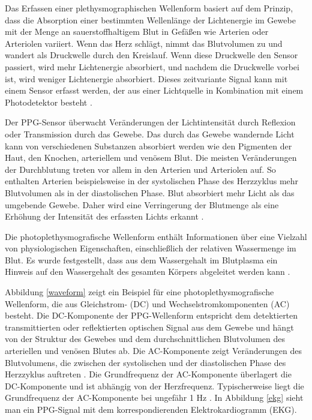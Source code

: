 \documentclass[10pt,a4paper,headinclude,twoside, plainheadsepline, open=right, numbers=noenddot, twocolumn]{article}
\begin{document}
Das Erfassen einer plethysmographischen Wellenform basiert auf dem Prinzip, dass die Absorption einer bestimmten Wellenlänge der Lichtenergie im Gewebe mit der Menge an sauerstoffhaltigem Blut in Gefäßen wie Arterien oder Arteriolen variiert. 
Wenn das Herz schlägt, nimmt das Blutvolumen zu und wandert als Druckwelle durch den Kreislauf. 
Wenn diese Druckwelle den Sensor passiert, wird mehr Lichtenergie absorbiert, und nachdem die Druckwelle vorbei ist, wird weniger Lichtenergie absorbiert. 
Dieses zeitvariante Signal kann mit einem Sensor erfasst werden, der aus einer Lichtquelle in Kombination mit einem Photodetektor besteht \cite{mcpherson2015systems}.

Der PPG-Sensor überwacht Veränderungen der Lichtintensität durch Reflexion oder Transmission durch das Gewebe.
Das durch das Gewebe wandernde Licht kann von verschiedenen Substanzen absorbiert werden wie den Pigmenten der Haut, den Knochen, arteriellem und venösem Blut.
Die meisten Veränderungen der Durchblutung treten vor allem in den Arterien und Arteriolen auf.
So enthalten Arterien beispielsweise in der systolischen Phase des Herzzyklus mehr Blutvolumen als in der diastolischen Phase.
Blut absorbiert mehr Licht als das umgebende Gewebe.
Daher wird eine Verringerung der Blutmenge als eine Erhöhung der Intensität des erfassten Lichts erkannt \cite{tamura2014wearable}.

Die photoplethysmografische Wellenform enthält Informationen über eine Vielzahl von physiologischen Eigenschaften, einschließlich der relativen Wassermenge im Blut. 
Es wurde festgestellt, dass aus dem Wassergehalt im Blutplasma ein Hinweis auf den Wassergehalt des gesamten Körpers abgeleitet werden kann \cite{mcpherson2015systems}.

Abbildung \ref{waveform} zeigt ein Beispiel für eine photoplethysmografische Wellenform, die aus Gleichstrom- (DC) und Wechselstromkomponenten (AC) besteht.
Die DC-Komponente der PPG-Wellenform entspricht dem detektierten transmittierten oder reflektierten optischen Signal aus dem Gewebe und hängt von der Struktur des Gewebes und dem durchschnittlichen Blutvolumen des arteriellen und venösen Blutes ab.
Die AC-Komponente zeigt Veränderungen des Blutvolumens, die zwischen der systolischen und der diastolischen Phase des Herzzyklus auftreten \cite{tamura2014wearable}.
Die Grundfrequenz der AC-Komponente überlagert die DC-Komponente und ist abhängig von der Herzfrequenz.
Typischerweise liegt die Grundfrequenz der AC-Komponente bei ungefähr 1 Hz \cite{john2007photopletysmography}.
In Abbildung \ref{ekg} sieht man ein PPG-Signal mit dem korrespondierenden Elektrokardiogramm (EKG).
\end{document}
